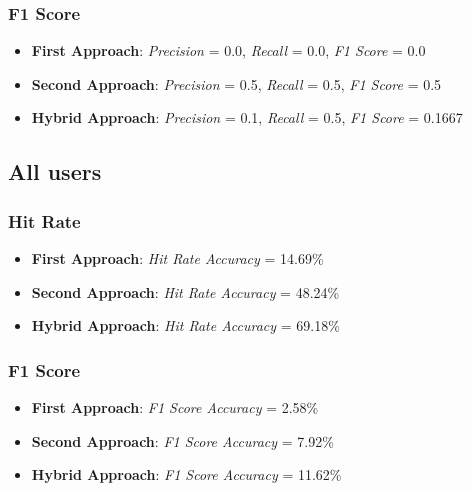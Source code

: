 \subsubsection{F1 Score}

\begin{itemize}
    \item \textbf{First Approach}: \textit{Precision} = 0.0, \textit{Recall} = 0.0, \textit{F1 Score} = 0.0
    \item \textbf{Second Approach}: \textit{Precision} = 0.5, \textit{Recall} = 0.5, \textit{F1 Score} = 0.5
    \item \textbf{Hybrid Approach}: \textit{Precision} = 0.1, \textit{Recall} = 0.5, \textit{F1 Score} = 0.1667
\end{itemize}

\subsection{All users}

\subsubsection{Hit Rate}

\begin{itemize}
    \item \textbf{First Approach}: \textit{Hit Rate Accuracy} = 14.69\%
    \item \textbf{Second Approach}: \textit{Hit Rate Accuracy} = 48.24\%
    \item \textbf{Hybrid Approach}: \textit{Hit Rate Accuracy} = 69.18\%
\end{itemize}

\subsubsection{F1 Score}

\begin{itemize}
    \item \textbf{First Approach}: \textit{F1 Score Accuracy} = 2.58\%
    \item \textbf{Second Approach}: \textit{F1 Score Accuracy} = 7.92\%
    \item \textbf{Hybrid Approach}: \textit{F1 Score Accuracy} = 11.62\%
\end{itemize}